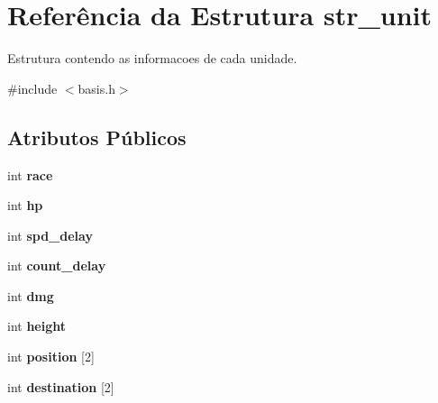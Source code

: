 \hypertarget{structstr__unit}{\section{\-Referência da \-Estrutura str\-\_\-unit}
\label{structstr__unit}
}


\-Estrutura contendo as informacoes de cada unidade.  




{\ttfamily \#include $<$basis.\-h$>$}

\subsection*{\-Atributos \-Públicos}
\begin{DoxyCompactItemize}
\item 
\hypertarget{structstr__unit_a734a90a135a1773d3ebc866974f9132a}{int {\bfseries race}}\label{structstr__unit_a734a90a135a1773d3ebc866974f9132a}

\item 
\hypertarget{structstr__unit_a039284484016e816af85d8801000532c}{int {\bfseries hp}}\label{structstr__unit_a039284484016e816af85d8801000532c}

\item 
\hypertarget{structstr__unit_ac9f35eb2790d579a0d97f12491fb408d}{int {\bfseries spd\-\_\-delay}}\label{structstr__unit_ac9f35eb2790d579a0d97f12491fb408d}

\item 
\hypertarget{structstr__unit_a31a1959eea34810dc6379c2e4882bdf3}{int {\bfseries count\-\_\-delay}}\label{structstr__unit_a31a1959eea34810dc6379c2e4882bdf3}

\item 
\hypertarget{structstr__unit_aaaa7721016e2d3135d261f2fe09e6154}{int {\bfseries dmg}}\label{structstr__unit_aaaa7721016e2d3135d261f2fe09e6154}

\item 
\hypertarget{structstr__unit_adea999c89b891501ae0da1f8b7017f86}{int {\bfseries height}}\label{structstr__unit_adea999c89b891501ae0da1f8b7017f86}

\item 
\hypertarget{structstr__unit_ae308d49e2667e0a30603e321a61db161}{int {\bfseries position} \mbox{[}2\mbox{]}}\label{structstr__unit_ae308d49e2667e0a30603e321a61db161}

\item 
\hypertarget{structstr__unit_a8d304a3c8661f09ab57956b51de73e2d}{int {\bfseries destination} \mbox{[}2\mbox{]}}\label{structstr__unit_a8d304a3c8661f09ab57956b51de73e2d}


\end{DoxyCompactItemize}
